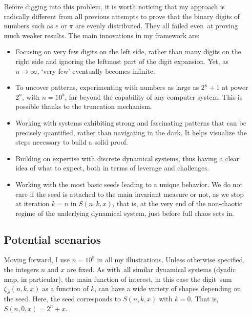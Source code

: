 \documentclass[10pt]{article}
\begin{document}
Before digging into this problem, it is worth noticing that my approach is radically different from all previous attempts to
prove that the binary digits of numbers such as $e$ or $\pi$ are evenly distributed. They all failed even~at proving much weaker results. The main innovations in my framework are:
\vspace{1ex}
\begin{itemize}
\item Focusing on very few digits on the left side, rather than many digits on the right side and ignoring the leftmost part of the digit expansion. Yet, as $n\rightarrow\infty$, `very few' eventually becomes infinite.  
\item To uncover patterns, experimenting with numbers as large as $2^n+1$ at power $2^n$, with $n=10^5$, far beyond the capability of any computer system. This is possible thanks to the truncation mechanism.
\item Working with systems exhibiting strong and fascinating patterns that can be precisely quantified, rather than navigating in the dark. It helps visualize the steps necessary to build a solid proof. 
\item Building on expertise with discrete dynamical systems, thus having a clear idea of what to expect, both in terms of leverage and challenges.  
\item Working with the most basic seeds leading to a unique behavior. We do not care if the seed 
 is attached to the main invariant measure or not, as we stop at iteration $k=n$ in $S(n, k, x)$, that is, at the very end 
of the non-chaotic regime of the underlying dynamical system, just before full chaos sets in. 
\end{itemize}
\vspace{1ex}



\subsection{Potential scenarios}

Moving forward, I use $n=10^5$ in all my illustrations. Unless otherwise specified, the integers $n$ and $x$ are fixed. As with~all similar dynamical systems (dyadic map, in particular), the main function of interest, in this case the digit~sum $\zeta   _S(n, k, x)$ as a function of $k$, can have a wide variety of shapes depending on the seed. Here, the seed corresponds to $S(n,k,x)$ with $k=0$. That is, $S(n, 0, x) = 2^n + x$. 
\end{document}
